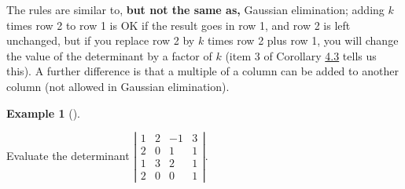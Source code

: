 \documentclass[
  a4paper,
  DIV=11,
  numbers=noendperiod,
  oneside]{scrreprt}
\theoremstyle{definition}
\newtheorem{example}{Example}[chapter]
\theoremstyle{remark}
\begin{document}
\begin{tcolorbox}[enhanced jigsaw, opacitybacktitle=0.6, left=2mm, breakable, bottomrule=.15mm, colbacktitle=quarto-callout-note-color!10!white, leftrule=.75mm, titlerule=0mm, rightrule=.15mm, toprule=.15mm, colback=white, toptitle=1mm, colframe=quarto-callout-note-color-frame, coltitle=black, bottomtitle=1mm, title=\textcolor{quarto-callout-note-color}{\faInfo}\hspace{0.5em}{Remember}, opacityback=0, arc=.35mm]

The rules are similar to, \textbf{but not the same as,} Gaussian
elimination; adding \(k\) times row 2 to row 1 is OK if the result goes
in row 1, and row 2 is left unchanged, but if you replace row 2 by \(k\)
times row 2 plus row 1, you will change the value of the determinant by
a factor of \(k\) (item 3 of Corollary \hyperref[calcdet]{4.3} tells us
this). A further difference is that a multiple of a column can be added
to another column (not allowed in Gaussian elimination).

\end{tcolorbox}

\begin{example}[]\protect\hypertarget{exm-det6}{}\label{exm-det6}

Evaluate the determinant \(\left|
\begin{array}{cccc}
1 & 2 & -1 & 3 \\
2 & 0 & 1 & 1 \\
1 & 3 & 2 & 1 \\
2 & 0 & 0 & 1
\end{array}
\right| .\)

\end{example}
\end{document}
